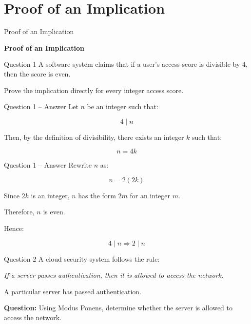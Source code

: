 \section{Proof of an Implication}

\begin{frame}{Proof of an Implication}
\begin{center}
\vspace{1.5cm}
{\Huge\textbf{Proof of an Implication}}
\end{center}
\end{frame}


\begin{frame}{Question 1}
A software system claims that if a user's access score is divisible by $4$,
then the score is even.

Prove the implication directly for every integer access score.
\end{frame}

\begin{frame}{Question 1 -- Answer}
Let $n$ be an integer such that:

$$
4\mid n
$$

Then, by the definition of divisibility, there exists an integer $k$ such
that:

$$
n=4k
$$

\end{frame}

\begin{frame}{Question 1 -- Answer}
Rewrite $n$ as:

$$
n=2(2k)
$$

Since $2k$ is an integer, $n$ has the form $2m$ for an integer $m$.

Therefore, $n$ is even.

Hence:

$$
\boxed{4\mid n\Rightarrow2\mid n}
$$

\end{frame}


\begin{frame}{Question 2}
A cloud security system follows the rule:

\begin{center}
\textit{If a server passes authentication, then it is allowed to access the network.}
\end{center}

A particular server has passed authentication.

\textbf{Question:} Using Modus Ponens, determine whether the server is
allowed to access the network.
\end{frame}


